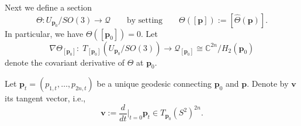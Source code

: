 \documentclass[11pt]{amsart}
\newcommand{\MH}{\mathcal{H}}
\newcommand{\MQ}{\mathcal{Q}}
\newcommand{\ME}{\mathcal{E}}
\newcommand{\mbp}{\mathbf{p}}
\newcommand{\mbv}{\mathbf{v}}
\begin{document}
%

Next we define a section
\[
\Theta:U_{\mbp_0}/SO(3)\to \MQ\qquad\text{by setting}\qquad
\Theta([\mbp]):=[\hat{\Theta}(\mbp)].
\]
In particular, we have $\Theta([\mbp_0])=0$. Let
\begin{equation}
	\label{Eq_DerivOfTheta}
	\nabla\Theta_{[\mbp_0]}:\; T_{[\mbp_0]}(U_{\mbp_0}/SO(3))
	\longrightarrow \MQ_{[\mbp_0]} \cong \mathbb{C}^{2n}/H_2(\mbp_0)
\end{equation}
denote the covariant derivative of $\Theta$ at $\mbp_0$. 

Let $\mbp_t=(p_{1,t},\ldots,p_{2n,t})$ be a unique geodesic connecting  $\mbp_0$ and $\mbp$. 
Denote by $\mbv$ its tangent vector, i.e.,
\[
\mbv := \frac{d}{dt}\Big|_{t=0} \mbp_t\in T_{\mbp_0}(S^2)^{2n}.
\]
\end{document}
